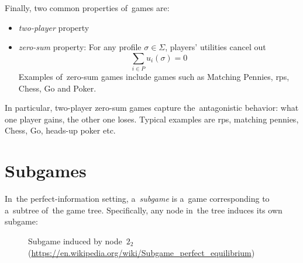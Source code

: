 Finally, two common properties of~games are:
\begin{itemize}
  \item \emph{two-player} property
  \item \emph{zero-sum} property:
    For any profile $\sigma \in \Sigma$, players' utilities cancel out
    \[ \sum _{i \in P} u _i (\sigma) = 0 \]
    Examples of~zero-sum games include games such as Matching Pennies, \acrshort{rps}, Chess, Go and Poker.
\end{itemize}
In particular, two-player zero-sum games capture the~antagonistic behavior:
what one player gains, the other one loses.
Typical examples are \acrshort{rps}, matching pennies, Chess, Go, heads-up poker etc.

\section{Subgames}
In~the perfect-information setting, a~\emph{subgame} is a~game corresponding to a~subtree of~the game tree.
Specifically, any node in~the tree induces its own subgame:
\begin{figure}[H]
  \centering
  \scriptsize
  \def\svgwidth{.7\textwidth}
  
  \def\captionTitle{Subgame induced by node~$2_2$}
  \caption[\captionTitle]{\captionTitle{}\\ (\href{https://en.wikipedia.org/wiki/Subgame_perfect_equilibrium}{https://en.wikipedia.org/wiki/Subgame\_perfect\_equilibrium})}
  \label{fig:ext-form-subgame}
\end{figure}


